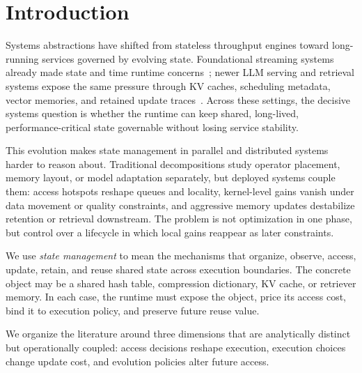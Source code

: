 ﻿\documentclass[manuscript]{acmart}
\newcommand{\sysproblem}{state management in parallel and distributed systems\xspace}
\begin{document}
\maketitle
\renewcommand{\shortauthors}{Zhang et al.}

\section{Introduction}

Systems abstractions have shifted from stateless throughput engines toward long-running services governed by evolving state. Foundational streaming systems already made state and time runtime concerns~\cite{akidau2013millwheel,murray2013naiad,zaharia2013dstreams,akidau2015dataflow}; newer LLM serving and retrieval systems expose the same pressure through KV caches, scheduling metadata, vector memories, and retained update traces~\cite{kwon2023pagedattention,agrawal2024sarathi,zheng2023sglang,zhou2025ferret,zhang2026flowrag}. Across these settings, the decisive systems question is whether the runtime can keep shared, long-lived, performance-critical state governable without losing service stability.

This evolution makes \sysproblem harder to reason about. Traditional decompositions study operator placement, memory layout, or model adaptation separately, but deployed systems couple them: access hotspots reshape queues and locality, kernel-level gains vanish under data movement or quality constraints, and aggressive memory updates destabilize retention or retrieval downstream. The problem is not optimization in one phase, but control over a lifecycle in which local gains reappear as later constraints.

We use \emph{state management} to mean the mechanisms that organize, observe, access, update, retain, and reuse shared state across execution boundaries. The concrete object may be a shared hash table, compression dictionary, KV cache, or retriever memory. In each case, the runtime must expose the object, price its access cost, bind it to execution policy, and preserve future reuse value.

We organize the literature around three dimensions that are analytically distinct but operationally coupled: access decisions reshape execution, execution choices change update cost, and evolution policies alter future access.
\end{document}
